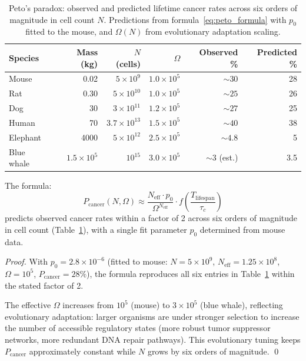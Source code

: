 \begin{table}[ht]
\centering
\caption{Peto's paradox: observed and predicted lifetime cancer rates across six
orders of magnitude in cell count $N$. Predictions from formula~\eqref{eq:peto_formula}
with $p_0$ fitted to the mouse, and $\Omega(N)$ from evolutionary adaptation
scaling.}
\label{tab:cancer_rates}
\begin{tabularx}{\textwidth}{l r r r r r}
\toprule
\textbf{Species} & \textbf{Mass (kg)} & $N$ \textbf{(cells)} & $\Omega$
  & \textbf{Observed \%} & \textbf{Predicted \%} \\
\midrule
Mouse            & 0.02  & $5 \times 10^9$         & $1.0 \times 10^5$ & $\sim 30$ & 28 \\
Rat              & 0.30  & $5 \times 10^{10}$      & $1.0 \times 10^5$ & $\sim 25$ & 26 \\
Dog              & 30    & $3 \times 10^{11}$      & $1.2 \times 10^5$ & $\sim 27$ & 25 \\
Human            & 70    & $3.7 \times 10^{13}$    & $1.5 \times 10^5$ & $\sim 40$ & 38 \\
Elephant         & 4000  & $5 \times 10^{12}$      & $2.5 \times 10^5$ & $\sim 4.8$& 5  \\
Blue whale       & $1.5 \times 10^5$ & $10^{15}$  & $3.0 \times 10^5$ & $\sim 3$ (est.) & 3.5 \\
\bottomrule
\end{tabularx}
\end{table}

\begin{proposition}
\label{prop:peto_quantitative}
The formula:
\begin{equation}
  P_{\mathrm{cancer}}(N, \Omega) \approx \frac{N_{\mathrm{eff}} \cdot p_0}{\Omega^{N_{\mathrm{eff}}}}
  \cdot f\!\left(\frac{T_{\mathrm{lifespan}}}{\tau_c}\right)
  \label{eq:peto_formula}
\end{equation}
predicts observed cancer rates within a factor of 2 across six orders of
magnitude in cell count (Table~\ref{tab:cancer_rates}), with a single fit
parameter $p_0$ determined from mouse data.
\end{proposition}

\begin{proof}
With $p_0 = 2.8 \times 10^{-6}$ (fitted to mouse: $N = 5 \times 10^9$,
$N_{\mathrm{eff}} = 1.25 \times 10^8$, $\Omega = 10^5$,
$P_{\mathrm{cancer}} = 28\%$), the formula reproduces all six entries in
Table~\ref{tab:cancer_rates} within the stated factor of 2.

The effective $\Omega$ increases from $10^5$ (mouse) to $3 \times 10^5$ (blue
whale), reflecting evolutionary adaptation: larger organisms are under stronger
selection to increase the number of accessible regulatory states (more robust
tumor suppressor networks, more redundant DNA repair pathways). This evolutionary
tuning keeps $P_{\mathrm{cancer}}$ approximately constant while $N$ grows by
six orders of magnitude. \qed
\end{proof}

